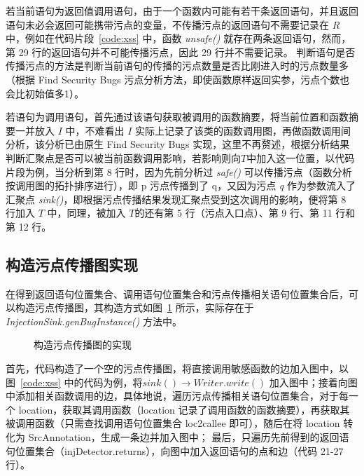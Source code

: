 若当前语句为返回值调用语句，由于一个函数内可能有若干条返回语句，并且返回语句未必会返回可能携带污点的变量，不传播污点的返回语句不需要记录在 $R$ 中，例如在代码片段~\ref{code:xss} 中，函数 \textit{unsafe()} 就存在两条返回语句，然而，第 29 行的返回语句并不可能传播污点，因此 29 行并不需要记录。 判断语句是否传播污点的方法是判断当前语句的传播的污点数量是否比刚进入时的污点数量多（根据 Find Security Bugs 污点分析方法，即使函数原样返回实参，污点个数也会比初始值多1）。

若语句为调用语句，首先通过该语句获取被调用的函数摘要，将当前位置和函数摘要一并放入 $I$ 中，不难看出 $I$ 实际上记录了该类的函数调用图，再做函数调用间分析，该分析已由原生 Find Security Bugs 实现，这里不再赘述，根据分析结果判断汇聚点是否可以被当前函数调用影响，若影响则向$T$中加入这一位置，以代码片段为例，当分析到第 8 行时，因为先前分析过 \textit{safe()} 可以传播污点（函数分析按调用图的拓扑排序进行），即 p 污点传播到了 q，又因为污点 \textit{q} 作为参数流入了汇聚点 \textit{sink()}，即根据污点传播结果发现汇聚点受到这次调用的影响，便将第 8 行加入 $T$ 中，同理，被加入 $T$的还有第 5 行（污点入口点）、第 9 行、第 11 行和第 12 行。\\



\subsection{构造污点传播图实现}
在得到返回语句位置集合、调用语句位置集合和污点传播相关语句位置集合后，可以构造污点传播图，其构造方式如图~\ref{code:taintGraph} 所示，实际存在于 \textit{InjectionSink.genBugInstance()} 方法中。

\begin{figure}[!htbp]
    \begin{minipage}[!htbp]{0.9\textwidth}
        
    \end{minipage}
    \caption{构造污点传播图的实现}\label{code:taintGraph}
\end{figure}

首先，代码构造了一个空的污点传播图，将直接调用敏感函数的边加入图中，以图~\ref{code:xss} 中的代码为例，将$sink() \rightarrow Writer.write()$ 加入图中；接着向图中添加相关函数调用的边，具体地说，遍历污点传播相关语句位置集合，对于每一个 location，获取其调用函数（location 记录了调用函数的函数摘要），再获取其被调用函数（只需查找调用语句位置集合 loc2callee 即可），随后在将 location 转化为 SrcAnnotation，生成一条边并加入图中； 最后，只遍历先前得到的返回语句位置集合（injDetector.returns），向图中加入返回语句的点和边（代码 21-27 行）。\\

